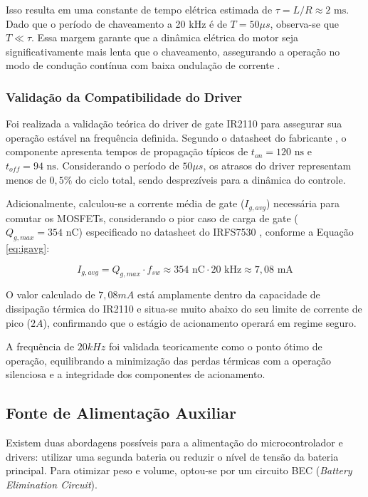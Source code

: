 Isso resulta em uma constante de tempo elétrica estimada de $\tau = L/R \approx 2 \text{ ms}$. Dado que o período de chaveamento a 20 kHz é de $T = 50 \mu s$, observa-se que $T \ll \tau$. Essa margem garante que a dinâmica elétrica do motor seja significativamente mais lenta que o chaveamento, assegurando a operação no modo de condução contínua com baixa ondulação de corrente \cite{hanselman2003brushless}.

\subsubsection{Validação da Compatibilidade do Driver}
Foi realizada a validação teórica do driver de gate IR2110 para assegurar sua operação estável na frequência definida. Segundo o datasheet do fabricante \cite{infineon2005}, o componente apresenta tempos de propagação típicos de $t_{on} = 120 \text{ ns}$ e $t_{off} = 94 \text{ ns}$. Considerando o período de $50 \mu s$, os atrasos do driver representam menos de $0,5\%$ do ciclo total, sendo desprezíveis para a dinâmica do controle.

Adicionalmente, calculou-se a corrente média de gate ($I_{g,avg}$) necessária para comutar os MOSFETs, considerando o pior caso de carga de gate ($Q_{g,max} = 354 \text{ nC}$) especificado no datasheet do IRFS7530 \cite{infineon7530}, conforme a Equação \ref{eq:igavg}:

\begin{equation} \label{eq:igavg}
I_{g,avg} = Q_{g,max} \cdot f_{sw} \approx 354 \text{ nC} \cdot 20 \text{ kHz} \approx 7,08 \text{ mA}
\end{equation}

O valor calculado de $7,08 mA$ está amplamente dentro da capacidade de dissipação térmica do IR2110 e situa-se muito abaixo do seu limite de corrente de pico ($2 A$), confirmando que o estágio de acionamento operará em regime seguro.

A frequência de $20 kHz$ foi validada teoricamente como o ponto ótimo de operação, equilibrando a minimização das perdas térmicas com a operação silenciosa e a integridade dos componentes de acionamento.

\subsection{Fonte de Alimentação Auxiliar}
Existem duas abordagens possíveis para a alimentação do microcontrolador e drivers: utilizar uma segunda bateria ou reduzir o nível de tensão da bateria principal. Para otimizar peso e volume, optou-se por um circuito BEC (\textit{Battery Elimination Circuit}).

